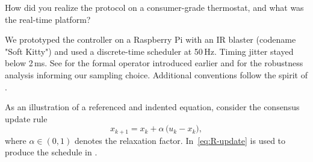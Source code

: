 \documentclass[a4paper,11pt]{article}
\begin{document}
\begin{question}[q:hardware]
How did you realize the protocol on a consumer-grade thermostat, and what was the real-time platform?
\end{question}
\begin{answer}[a:hardware]
We prototyped the controller on a Raspberry Pi with an IR blaster (codename "Soft Kitty") and used a discrete-time scheduler at 50\,Hz. Timing jitter stayed below 2\,ms. See  for the formal operator introduced earlier and  for the robustness analysis informing our sampling choice. Additional conventions follow the spirit of \cite{cooper2011roommate}.

\begin{center}
\begin{minipage}{0.9\linewidth}
    \centering
    \label{fig:R-platform}
\end{minipage}
\end{center}

As an illustration of a referenced and indented equation, consider the consensus update rule
\begin{equation}
    \label{eq:R-update}
    x_{k+1} = x_k + \alpha\, \big( u_k - x_k \big),
\end{equation}
where $\alpha\in(0,1)$ denotes the relaxation factor. In~\eqref{eq:R-update} is used to produce the schedule in .
\end{answer}
\end{document}
